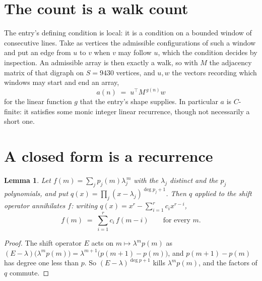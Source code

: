 \documentclass[11pt,a4paper]{article}
\theoremstyle{plain}
\newtheorem{lemma}[theorem]{Lemma}
\theoremstyle{definition}
\begin{document}
\section{The count is a walk count}

The entry's defining condition is local: it is a condition on a bounded window of consecutive lines. Take as vertices the
admissible configurations of such a window and put an edge from $u$ to $v$ when $v$ may
follow $u$, which the condition decides by inspection. An admissible array is then exactly a
walk, so with $M$ the adjacency matrix of that digraph on $S=9430$ vertices, and $u,w$ the
vectors recording which windows may start and end an array,
\[
a(n)\;=\;u^{\!\top}M^{\,g(n)}w
\]
for the linear function $g$ that the entry's shape supplies. In particular $a$ is
$C$-finite: it satisfies some monic integer linear recurrence, though not necessarily a short
one.

\section{A closed form is a recurrence}

\begin{lemma}\label{lem:ann}
Let $f(m)=\sum_{j}p_j(m)\lambda_j^{\,m}$ with the $\lambda_j$ distinct and the $p_j$
polynomials, and put $q(x)=\prod_j(x-\lambda_j)^{\deg p_j+1}$. Then $q$ applied to the shift
operator annihilates $f$: writing $q(x)=x^{r}-\sum_{i=1}^{r}c_ix^{r-i}$,
\[
f(m)\;=\;\sum_{i=1}^{r}c_i\,f(m-i)\qquad\text{for every }m.
\]
\end{lemma}

\begin{proof}
The shift operator $E$ acts on $m\mapsto\lambda^{m}p(m)$ as
$(E-\lambda)\bigl(\lambda^{m}p(m)\bigr)=\lambda^{m+1}\bigl(p(m+1)-p(m)\bigr)$, and
$p(m+1)-p(m)$ has degree one less than $p$. So $(E-\lambda)^{\deg p+1}$ kills
$\lambda^{m}p(m)$, and the factors of $q$ commute.
\end{proof}
\end{document}

